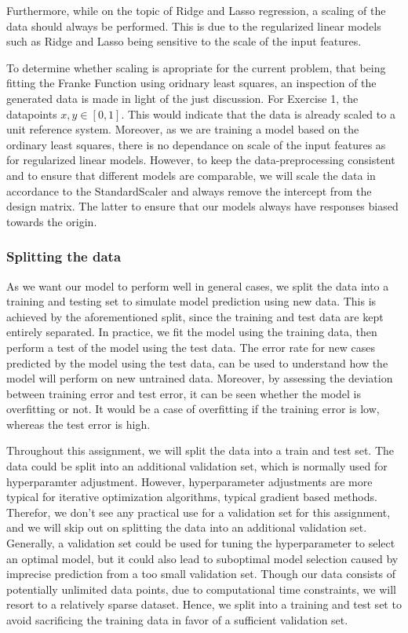 \documentclass[11pt, a4paper]{article}
\begin{document}
Furthermore, while on the topic of Ridge and Lasso regression, a scaling of the data should always be performed. This is due to the regularized linear models such as Ridge and Lasso being sensitive to the scale of the input features. \cite{Geron2019}

To determine whether scaling is apropriate for the current problem, that being fitting the Franke Function using oridnary least squares, an inspection of the generated data is made in light of the just discussion. For Exercise 1, the datapoints $x,y \in \left[0,1\right]$. This would indicate that the data is already scaled to a unit reference system. Moreover, as we are training a model based on the ordinary least squares, there is no dependance on scale of the input features as for regularized linear models. However, to keep the data-preprocessing consistent and to ensure that different models are comparable, we will scale the data in accordance to the StandardScaler and always remove the intercept from the design matrix. The latter to ensure that our models always have responses biased towards the origin.

\subsubsection*{Splitting the data}
As we want our model to perform well in general cases, we split the data into a training and testing set to simulate model prediction using new data. This is achieved by the aforementioned split, since the training and test data are kept entirely separated. In practice, we fit the model using the training data, then perform a test of the model using the test data. The error rate for new cases predicted by the model using the test data, can be used to understand how the model will perform on new untrained data. \cite{Geron2019} Moreover, by assessing the deviation between training error and test error, it can be seen whether the model is overfitting or not. It would be a case of overfitting if the training error is low, whereas the test error is high.

Throughout this assignment, we will split the data into a train and test set. The data could be split into an additional validation set, which is normally used for hyperparamter adjustment. However, hyperparameter adjustments are more typical for iterative optimization algorithms, typical 
gradient based methods. Therefor, we don't see any practical use for a validation set for this assignment, and we will skip out on splitting the data into an additional validation set. Generally, a validation set could be used for tuning the hyperparameter to select an optimal model, but it could also lead to suboptimal model selection caused by imprecise prediction from a too small validation set. \cite{Geron2019} Though our data consists of potentially unlimited data points, due to computational time constraints, we will resort to a relatively sparse dataset. Hence, we split into a training and test set to avoid sacrificing the training data in favor of a sufficient validation set.
\end{document}
